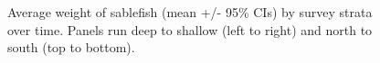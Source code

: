 \documentclass[12pt]{article}\usepackage[]{graphicx}\usepackage[]{color}
\begin{document}
\begin{figure}[htb]

{\centering {} 

}

\caption{Average weight of sablefish (mean +/- 95\% CIs) by survey strata over time. Panels run deep to shallow (left to right) and north to south (top to bottom).}\label{fig:figure9}
\end{figure}
\clearpage
\end{document}

